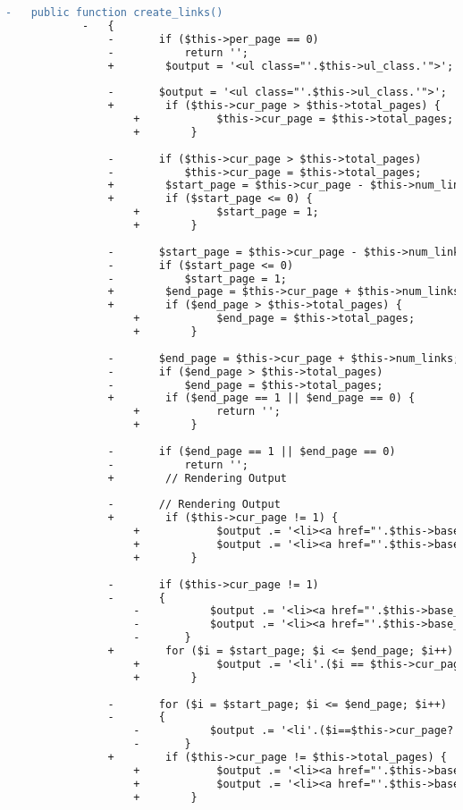 \begin{lstlisting}[language=diff, caption=Perubahan pada kode Shj\_pagination.php]
			-	public function create_links()
			-	{
				-		if ($this->per_page == 0)
				-			return '';
				+        $output = '<ul class="'.$this->ul_class.'">';
				
				-		$output = '<ul class="'.$this->ul_class.'">';
				+        if ($this->cur_page > $this->total_pages) {
					+            $this->cur_page = $this->total_pages;
					+        }
				
				-		if ($this->cur_page > $this->total_pages)
				-			$this->cur_page = $this->total_pages;
				+        $start_page = $this->cur_page - $this->num_links;
				+        if ($start_page <= 0) {
					+            $start_page = 1;
					+        }
				
				-		$start_page = $this->cur_page - $this->num_links;
				-		if ($start_page <= 0)
				-			$start_page = 1;
				+        $end_page = $this->cur_page + $this->num_links;
				+        if ($end_page > $this->total_pages) {
					+            $end_page = $this->total_pages;
					+        }
				
				-		$end_page = $this->cur_page + $this->num_links;
				-		if ($end_page > $this->total_pages)
				-			$end_page = $this->total_pages;
				+        if ($end_page == 1 || $end_page == 0) {
					+            return '';
					+        }
				
				-		if ($end_page == 1 || $end_page == 0)
				-			return '';
				+        // Rendering Output
				
				-		// Rendering Output
				+        if ($this->cur_page != 1) {
					+            $output .= '<li><a href="'.$this->base_url.'">&lsaquo; First</a></li>';
					+            $output .= '<li><a href="'.$this->base_url.'/page/'.($this->cur_page - 1).'">&lsaquo;</a></li>';
					+        }
				
				-		if ($this->cur_page != 1)
				-		{
					-			$output .= '<li><a href="'.$this->base_url.'">&lsaquo; First</a></li>';
					-			$output .= '<li><a href="'.$this->base_url.'/page/'.($this->cur_page-1).'">&lsaquo;</a></li>';
					-		}
				+        for ($i = $start_page; $i <= $end_page; $i++) {
					+            $output .= '<li'.($i == $this->cur_page ? ' class="current_page"' : '').'><a href="'.$this->base_url.'/page/'.$i.'">'.$i.'</a></li>';
					+        }
				
				-		for ($i = $start_page; $i <= $end_page; $i++)
				-		{
					-			$output .= '<li'.($i==$this->cur_page?' class="current_page"':'').'><a href="'.$this->base_url.'/page/'.$i.'">'.$i.'</a></li>';
					-		}
				+        if ($this->cur_page != $this->total_pages) {
					+            $output .= '<li><a href="'.$this->base_url.'/page/'.($this->cur_page + 1).'">&rsaquo;</a></li>';
					+            $output .= '<li><a href="'.$this->base_url.'/page/'.$this->total_pages.'">Last ('.$this->total_pages.') &rsaquo;</a></li>';
					+        }
				

\end{lstlisting}
